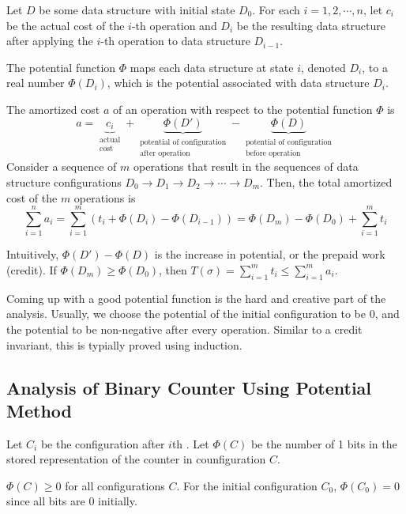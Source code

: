 \begin{definition} 
    Let $D$ be some data structure with initial state $D_0$. For each $i = 1,2,\cdots,n$, let $c_i$ be the actual cost of the $i$-th operation and $D_i$ be the resulting data structure after applying the $i$-th operation to data structure $D_{i-1}$.

    The potential function $\Phi$ maps each data structure at state $i$, denoted $D_i$, to a real number $\Phi(D_i)$, which is the potential associated with data structure $D_i$.

    The amortized cost $a$ of an operation with respect to the potential function $\Phi$ is
    $$
    a = \underbrace{c_i}_{\substack{\text{actual} \\ \text{cost}}} + \underbrace{\Phi(D')}_{\substack{\text{potential of configuration} \\ \text{after operation}}} - \underbrace{\Phi(D)}_{\substack{\text{potential of configuration} \\ \text{before operation}}}
    $$
    Consider a sequence of $m$ operations that result in the sequences of data structure configurations $D_0 \to D_1 \to D_2 \to \cdots \to D_m$. Then, the total amortized cost of the $m$ operations is
    $$
    \sum_{i=1}^{n} a_i = \sum_{i=1}^{m} \left( t_i + \Phi(D_i) - \Phi(D_{i-1}) \right) = \Phi(D_m) - \Phi(D_0) + \sum_{i=1}^{m} t_i
    $$
\end{definition}
Intuitively, $\Phi(D')-\Phi(D)$ is the increase in potential, or the prepaid work (credit). If $\Phi(D_m) \geq \Phi(D_0)$, then $T(\sigma) = \sum_{i=1}^m t_i \leq \sum_{i=1}^m a_i$.

Coming up with a good potential function is the hard and creative part of the analysis. Usually, we choose the potential of the initial configuration to be 0, and the potential to be non-negative after every operation. Similar to a credit invariant, this is typially proved using induction.

\subsection{Analysis of Binary Counter Using Potential Method}

Let $C_i$ be the configuration after $i$th . Let $\Phi(C)$ be the number of 1 bits in the stored representation of the counter in counfiguration $C$.

$\Phi(C) \geq 0$ for all configurations $C$. For the initial configuration $C_0$, $\Phi(C_0) = 0$ since all bits are 0 initially.

